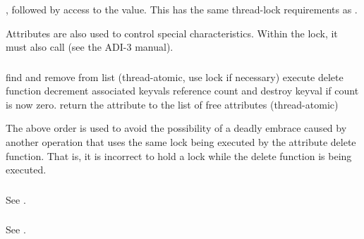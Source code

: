 \documentclass{article}
\begin{document}
\subsubsection{}
, followed by access to the value.  This has
the same thread-lock requirements as .

Attributes are also used to control special characteristics.  Within
the lock, it must also call 
(see the ADI-3 manual).





\subsubsection{}
\begin{algorithm}
find and remove from list (thread-atomic, use lock if necessary)
execute delete function
decrement associated keyvals reference count and destroy keyval if
count is now zero.
return the attribute to the list of free attributes (thread-atomic)
\end{algorithm}
The above order is used to avoid the possibility of a deadly embrace
caused by another operation that uses the same lock being executed by
the attribute delete function.  That is, it is incorrect to hold a
lock while the delete function is being executed.

\subsubsection{}
See .

\subsubsection{}
See .
\end{document}
